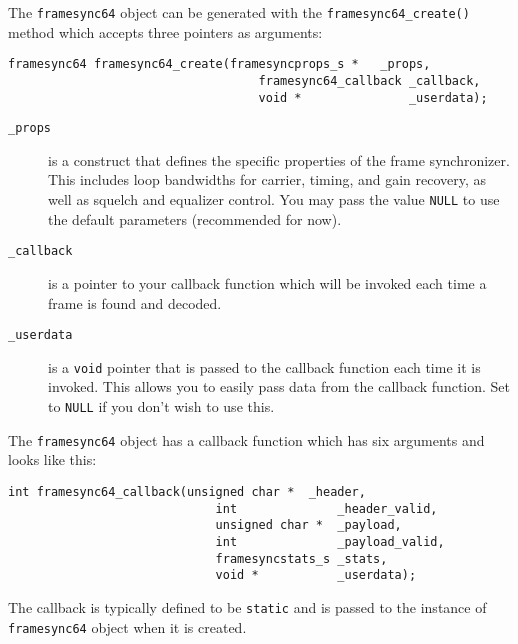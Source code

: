 The {\tt framesync64} object can be generated with the
{\tt framesync64\_create()} method which accepts three pointers as
arguments:
%
\begin{Verbatim}[fontsize=\small]
    framesync64 framesync64_create(framesyncprops_s *   _props,
                                   framesync64_callback _callback,
                                   void *               _userdata);
\end{Verbatim}
%
%
\begin{description}
\item[{\tt \_props}]
    is a construct that defines the specific properties of the frame
    synchronizer.
    This includes loop bandwidths for carrier, timing, and gain
    recovery, as well as squelch and equalizer control.
    You may pass the value {\tt NULL} to use the default parameters
    (recommended for now).
\item[{\tt \_callback}]
    is a pointer to your callback function which will be invoked each
    time a frame is found and decoded.
\item[{\tt \_userdata}]
    is a {\tt void} pointer that is passed to the callback function each
    time it is invoked.
    This allows you to easily pass data from the callback function.
    Set to {\tt NULL} if you don't wish to use this.
\end{description}
%
The {\tt framesync64} object has a callback function which has six
arguments and looks like this:
%
\begin{Verbatim}[fontsize=\small]
    int framesync64_callback(unsigned char *  _header,
                             int              _header_valid,
                             unsigned char *  _payload,
                             int              _payload_valid,
                             framesyncstats_s _stats,
                             void *           _userdata);
\end{Verbatim}
%
The callback is typically defined to be {\tt static} and is passed to
the instance of {\tt framesync64} object when it is created.
%
